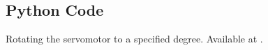 \begin{enumerate}
        
        
\end{enumerate}

\subsection{Python Code}
\lstset{style=mystyle}
\label{sec:servo-python-code}

\begin{pycode}
   {Rotating
    the servomotor to a specified degree.  Available at
    .}
  \label{py:servo-init}
  
\end{pycode}

